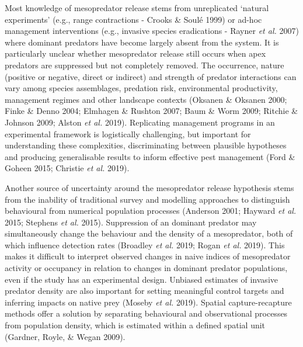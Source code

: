 \documentclass[11pt,a4paper,titlepage,twoside,openright]{style/unimelbthesis}
\begin{document}
\begin{mainmatter}
Most knowledge of mesopredator release stems from unreplicated `natural experiments' (e.g., range contractions - Crooks \& Soulé 1999) or ad-hoc management interventions (e.g., invasive species eradications - Rayner \emph{et al.} 2007) where dominant predators have become largely absent from the system. It is particularly unclear whether mesopredator release still occurs when apex predators are suppressed but not completely removed. The occurrence, nature (positive or negative, direct or indirect) and strength of predator interactions can vary among species assemblages, predation risk, environmental productivity, management regimes and other landscape contexts (Oksanen \& Oksanen 2000; Finke \& Denno 2004; Elmhagen \& Rushton 2007; Baum \& Worm 2009; Ritchie \& Johnson 2009; Alston \emph{et al.} 2019). Replicating management programs in an experimental framework is logistically challenging, but important for understanding these complexities, discriminating between plausible hypotheses and producing generalisable results to inform effective pest management (Ford \& Goheen 2015; Christie \emph{et al.} 2019).

Another source of uncertainty around the mesopredator release hypothesis stems from the inability of traditional survey and modelling approaches to distinguish behavioural from numerical population processes (Anderson 2001; Hayward \emph{et al.} 2015; Stephens \emph{et al.} 2015). Suppression of an dominant predator may simultaneously change the behaviour and the density of a mesopredator, both of which influence detection rates (Broadley \emph{et al.} 2019; Rogan \emph{et al.} 2019). This makes it difficult to interpret observed changes in naive indices of mesopredator activity or occupancy in relation to changes in dominant predator populations, even if the study has an experimental design. Unbiased estimates of invasive predator density are also important for setting meaningful control targets and inferring impacts on native prey (Moseby \emph{et al.} 2019). Spatial capture-recapture methods offer a solution by separating behavioural and observational processes from population density, which is estimated within a defined spatial unit (Gardner, Royle, \& Wegan 2009).


\end{mainmatter}
\end{document}
